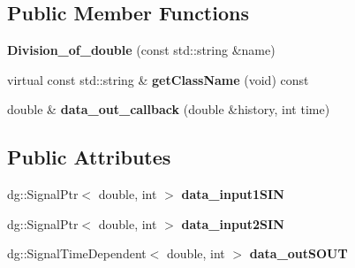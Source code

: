 \subsection*{Public Member Functions}
\begin{DoxyCompactItemize}
\item 
{\bfseries Division\+\_\+of\+\_\+double} (const std\+::string \&name)\hypertarget{classdg__tools_1_1Division__of__double_ae698007fb4d82e24174910c5385cb44c}{}\label{classdg__tools_1_1Division__of__double_ae698007fb4d82e24174910c5385cb44c}

\item 
virtual const std\+::string \& {\bfseries get\+Class\+Name} (void) const \hypertarget{classdg__tools_1_1Division__of__double_ab90859b031e0932c31a7baaef4ae7b9c}{}\label{classdg__tools_1_1Division__of__double_ab90859b031e0932c31a7baaef4ae7b9c}

\item 
double \& {\bfseries data\+\_\+out\+\_\+callback} (double \&history, int time)\hypertarget{classdg__tools_1_1Division__of__double_a40b74e93432b90ec3a4e4f6c74e326a4}{}\label{classdg__tools_1_1Division__of__double_a40b74e93432b90ec3a4e4f6c74e326a4}

\end{DoxyCompactItemize}
\subsection*{Public Attributes}
\begin{DoxyCompactItemize}
\item 
dg\+::\+Signal\+Ptr$<$ double, int $>$ {\bfseries data\+\_\+input1\+S\+IN}\hypertarget{classdg__tools_1_1Division__of__double_aaf6e1589451cddb810b38a08bd748efa}{}\label{classdg__tools_1_1Division__of__double_aaf6e1589451cddb810b38a08bd748efa}

\item 
dg\+::\+Signal\+Ptr$<$ double, int $>$ {\bfseries data\+\_\+input2\+S\+IN}\hypertarget{classdg__tools_1_1Division__of__double_a6f4769e743ed8dcca7435bde53d6d3fe}{}\label{classdg__tools_1_1Division__of__double_a6f4769e743ed8dcca7435bde53d6d3fe}

\item 
dg\+::\+Signal\+Time\+Dependent$<$ double, int $>$ {\bfseries data\+\_\+out\+S\+O\+UT}\hypertarget{classdg__tools_1_1Division__of__double_a006ca9e71348cf60feca0ec3137a65ec}{}\label{classdg__tools_1_1Division__of__double_a006ca9e71348cf60feca0ec3137a65ec}

\end{DoxyCompactItemize}
